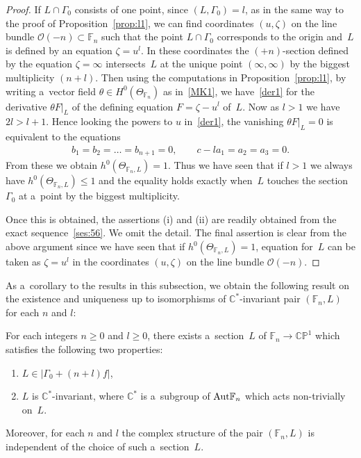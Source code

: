 \begin{proof}
If $L\cap \Gamma_0$ consists of one point, since $(L,\Gamma_0)=l$, as in the same way to the proof of
Proposition~\ref{prop:l1}, we can f\/ind coordinates $(u,\zeta)$ on the line bundle $\mathscr O(-n)\subset\mathbb{F}_n$
such that the point $L\cap \Gamma_0$ corresponds to the origin and~$L$ is def\/ined by an equation $\zeta = u^l$.
In these coordinates the $(+n)$-section def\/ined by the equation $\zeta=\infty$ intersects~$L$ at the unique point
$(\infty,\infty)$ by the biggest multiplicity $(n+l)$.
Then using the computations in Proposition~\ref{prop:l1}, by writing a~vector f\/ield $\theta\in H^0(\Theta_{\mathbb{F}_n})$
as in~\eqref{MK1}, we have~\eqref{der1} for the derivative $\theta F|_L$ of the def\/ining equation $F=\zeta-u^l$ of~$L$.
Now as $l>1$ we have $2l>l+1$.
Hence looking the powers to $u$ in~\eqref{der1}, the vanishing $\theta F|_L = 0$ is equivalent to the equations
\begin{gather*}
b_1=b_2=\dots=b_{n+1} = 0,
\qquad
c-la_1 = a_2 = a_3 = 0.
\end{gather*}
From these we obtain $h^0(\Theta_{\mathbb{F}_n, L})=1$.
Thus we have seen that if $l>1$ we always have \mbox{$h^0(\Theta_{\mathbb{F}_n,L}) \le 1$} and the equality holds exactly
when~$L$ touches the section $\Gamma_0$ at a~point by the biggest multiplicity.

Once this is obtained, the assertions (i) and (ii) are readily obtained from the exact sequence~\eqref{ses:56}.
We omit the detail.
The f\/inal assertion is clear from the above argument since we have seen that if $h^0(\Theta_{\mathbb{F}_n,L}) = 1$,
equation for~$L$ can be taken as $\zeta=u^l$ in the coordinates $(u,\zeta)$ on the line bundle $\mathscr O(-n)$.
\end{proof}

As a~corollary to the results in this subsection, we obtain the following result on the existence and uniqueness up to
isomorphisms of $\mathbb{C}^*$-invariant pair $(\mathbb{F}_n,L)$ for each $n$ and $l$:

\begin{Corollary}\label{cor:unique}
For each integers $n\ge 0$ and $l\ge 0$, there exists a~section~$L$ of $\mathbb{F}_n\to\mathbb{CP}^1$ which satisfies
the following two properties:
\begin{enumerate}\itemsep=0pt
\item[$(i)$] $L\in |\Gamma_0+(n+l)f|$,
\item[$(ii)$] $L$ is $\mathbb{C}^*$-invariant, where $\mathbb{C}^*$ is a~subgroup of ${\rm{Aut}}\mathbb{F}_n$ which acts
non-trivially on~$L$.
\end{enumerate}
Moreover, for each $n$ and $l$ the complex structure of the pair $(\mathbb{F}_n,L)$ is independent of the choice of such
a~section~$L$.
\end{Corollary}

